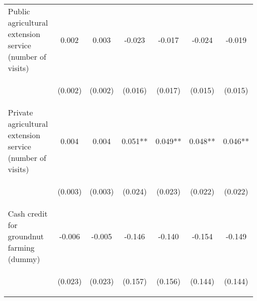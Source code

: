 \begin{center}
\begin{tabular}{lcccccc}
Public agricultural extension service (number of visits) & 0.002 & 0.003 & -0.023 & -0.017 & -0.024 & -0.019 \\
\vspace{4pt} & \begin{footnotesize}(0.002)\end{footnotesize} & \begin{footnotesize}(0.002)\end{footnotesize} & \begin{footnotesize}(0.016)\end{footnotesize} & \begin{footnotesize}(0.017)\end{footnotesize} & \begin{footnotesize}(0.015)\end{footnotesize} & \begin{footnotesize}(0.015)\end{footnotesize} \\
Private agricultural extension service (number of visits) & 0.004 & 0.004 & 0.051** & 0.049** & 0.048** & 0.046** \\
\vspace{4pt} & \begin{footnotesize}(0.003)\end{footnotesize} & \begin{footnotesize}(0.003)\end{footnotesize} & \begin{footnotesize}(0.024)\end{footnotesize} & \begin{footnotesize}(0.023)\end{footnotesize} & \begin{footnotesize}(0.022)\end{footnotesize} & \begin{footnotesize}(0.022)\end{footnotesize} \\
Cash credit for groundnut farming (dummy) & -0.006 & -0.005 & -0.146 & -0.140 & -0.154 & -0.149 \\
\vspace{4pt} & \begin{footnotesize}(0.023)\end{footnotesize} & \begin{footnotesize}(0.023)\end{footnotesize} & \begin{footnotesize}(0.157)\end{footnotesize} & \begin{footnotesize}(0.156)\end{footnotesize} & \begin{footnotesize}(0.144)\end{footnotesize} & \begin{footnotesize}(0.144)\end{footnotesize} \\

\end{tabular}
\end{center}
